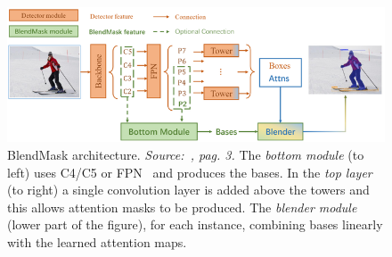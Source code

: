 \documentclass[10pt,twocolumn,letterpaper]{article}
\begin{document}
\begin{figure}[H]
\centering
  \includegraphics[width=1\linewidth]{./image/blendmask.png}
  \caption{BlendMask architecture. \textit{Source:~\cite{Authors2_BlendMask}, pag. 3.} The \textit{bottom module} (to left) uses C4/C5 or FPN~\cite{FPN} and produces the bases. In the \textit{top layer} (to right) a single convolution layer is added above the towers and this allows attention masks to be produced. The \textit{blender module} (lower part of the figure), for each instance, combining bases linearly with the learned attention maps.}
  \label{fig:blendmask}
\noindent
\end{figure}
\end{document}
